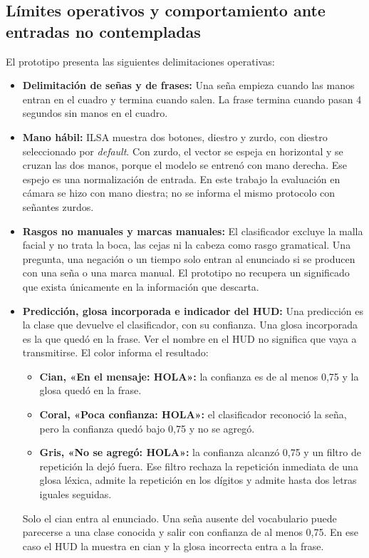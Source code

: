 \subsection{Límites operativos y comportamiento ante entradas no contempladas}
\label{sec:limites_operativos}
El prototipo presenta las siguientes delimitaciones operativas:
\begin{itemize}
    \item \textbf{Delimitación de señas y de frases:} Una seña empieza cuando las manos entran en el cuadro y termina cuando salen. La frase termina cuando pasan 4 segundos sin manos en el cuadro.
    \item \textbf{Mano hábil:} ILSA muestra dos botones, diestro y zurdo, con diestro seleccionado por \textit{default}. Con zurdo, el vector se espeja en horizontal y se cruzan las dos manos, porque el modelo se entrenó con mano derecha. Ese espejo es una normalización de entrada. En este trabajo la evaluación en cámara se hizo con mano diestra; no se informa el mismo protocolo con señantes zurdos. %
    \item \textbf{Rasgos no manuales y marcas manuales:} El clasificador excluye la malla facial y no trata la boca, las cejas ni la cabeza como rasgo gramatical. Una pregunta, una negación o un tiempo solo entran al enunciado si se producen con una seña o una marca manual. El prototipo no recupera un significado que exista únicamente en la información que descarta.
    \item \textbf{Predicción, glosa incorporada e indicador del HUD:} Una predicción es la clase que devuelve el clasificador, con su confianza. Una glosa incorporada es la que quedó en la frase. Ver el nombre en el HUD no significa que vaya a transmitirse. El color informa el resultado:
    \begin{itemize}
        \item \textbf{Cian, «En el mensaje: HOLA»:} la confianza es de al menos 0,75 y la glosa quedó en la frase.
        \item \textbf{Coral, «Poca confianza: HOLA»:} el clasificador reconoció la seña, pero la confianza quedó bajo 0,75 y no se agregó.
        \item \textbf{Gris, «No se agregó: HOLA»:} la confianza alcanzó 0,75 y un filtro de repetición la dejó fuera. Ese filtro rechaza la repetición inmediata de una glosa léxica, admite la repetición en los dígitos y admite hasta dos letras iguales seguidas.
    \end{itemize}
    Solo el cian entra al enunciado. Una seña ausente del vocabulario puede parecerse a una clase conocida y salir con confianza de al menos 0,75. En ese caso el HUD la muestra en cian y la glosa incorrecta entra a la frase.


\end{itemize}
